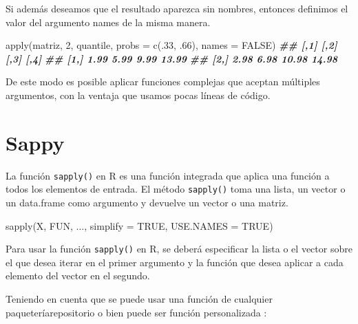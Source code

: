 \documentclass[
]{book}
\newenvironment{Shaded}{\begin{snugshade}}{\end{snugshade}}
\newcommand{\AttributeTok}[1]{\textcolor[rgb]{0.77,0.63,0.00}{#1}}
\newcommand{\ConstantTok}[1]{\textcolor[rgb]{0.00,0.00,0.00}{#1}}
\newcommand{\DecValTok}[1]{\textcolor[rgb]{0.00,0.00,0.81}{#1}}
\newcommand{\DocumentationTok}[1]{\textcolor[rgb]{0.56,0.35,0.01}{\textbf{\textit{#1}}}}
\newcommand{\FunctionTok}[1]{\textcolor[rgb]{0.00,0.00,0.00}{#1}}
\newcommand{\NormalTok}[1]{#1}
\begin{document}
Si además deseamos que el resultado aparezca sin nombres, entonces definimos el valor del argumento names de la misma manera.

\begin{Shaded}
\begin{Highlighting}[]
\FunctionTok{apply}\NormalTok{(matriz, }\DecValTok{2}\NormalTok{, quantile, }\AttributeTok{probs =} \FunctionTok{c}\NormalTok{(.}\DecValTok{33}\NormalTok{, .}\DecValTok{66}\NormalTok{), }\AttributeTok{names =} \ConstantTok{FALSE}\NormalTok{)}
\DocumentationTok{\#\#      [,1] [,2]  [,3]  [,4]}
\DocumentationTok{\#\# [1,] 1.99 5.99  9.99 13.99}
\DocumentationTok{\#\# [2,] 2.98 6.98 10.98 14.98}
\end{Highlighting}
\end{Shaded}

De este modo es posible aplicar funciones complejas que aceptan múltiples argumentos, con la ventaja que usamos pocas líneas de código.

\hypertarget{sappy}{%
\section{Sappy}\label{sappy}}

La función \texttt{sapply()} en R es una función integrada que aplica una función a todos los elementos de entrada. El método \texttt{sapply()} toma una lista, un vector o un data.frame como argumento y devuelve un vector o una matriz.

\begin{Shaded}
\begin{Highlighting}[]
\FunctionTok{sapply}\NormalTok{(X, FUN, ..., }\AttributeTok{simplify =} \ConstantTok{TRUE}\NormalTok{, }\AttributeTok{USE.NAMES =} \ConstantTok{TRUE}\NormalTok{)}
\end{Highlighting}
\end{Shaded}

Para usar la función \texttt{sapply()} en R, se deberá especificar la lista o el vector sobre el que desea iterar en el primer argumento y la función que desea aplicar a cada elemento del vector en el segundo.

Teniendo en cuenta que se puede usar una función de cualquier paquetería\textbar repositorio o bien puede ser función personalizada :
\end{document}
